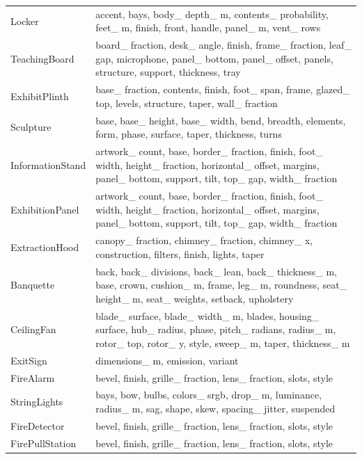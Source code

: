 \begin{longtable}{p{.20\linewidth}p{.74\linewidth}}
Locker & accent, bays, body\_ depth\_ m, contents\_ probability, feet\_ m, finish, front, handle, panel\_ m, vent\_ rows \\
TeachingBoard & board\_ fraction, desk\_ angle, finish, frame\_ fraction, leaf\_ gap, microphone, panel\_ bottom, panel\_ offset, panels, structure, support, thickness, tray \\
ExhibitPlinth & base\_ fraction, contents, finish, foot\_ span, frame, glazed\_ top, levels, structure, taper, wall\_ fraction \\
Sculpture & base, base\_ height, base\_ width, bend, breadth, elements, form, phase, surface, taper, thickness, turns \\
InformationStand & artwork\_ count, base, border\_ fraction, finish, foot\_ width, height\_ fraction, horizontal\_ offset, margins, panel\_ bottom, support, tilt, top\_ gap, width\_ fraction \\
ExhibitionPanel & artwork\_ count, base, border\_ fraction, finish, foot\_ width, height\_ fraction, horizontal\_ offset, margins, panel\_ bottom, support, tilt, top\_ gap, width\_ fraction \\
ExtractionHood & canopy\_ fraction, chimney\_ fraction, chimney\_ x, construction, filters, finish, lights, taper \\
Banquette & back, back\_ divisions, back\_ lean, back\_ thickness\_ m, base, crown, cushion\_ m, frame, leg\_ m, roundness, seat\_ height\_ m, seat\_ weights, setback, upholstery \\
CeilingFan & blade\_ surface, blade\_ width\_ m, blades, housing\_ surface, hub\_ radius, phase, pitch\_ radians, radius\_ m, rotor\_ top, rotor\_ y, style, sweep\_ m, taper, thickness\_ m \\
ExitSign & dimensions\_ m, emission, variant \\
FireAlarm & bevel, finish, grille\_ fraction, lens\_ fraction, slots, style \\
StringLights & bays, bow, bulbs, colors\_ srgb, drop\_ m, luminance, radius\_ m, sag, shape, skew, spacing\_ jitter, suspended \\
FireDetector & bevel, finish, grille\_ fraction, lens\_ fraction, slots, style \\
FirePullStation & bevel, finish, grille\_ fraction, lens\_ fraction, slots, style \\
\bottomrule
\end{longtable}
\normalsize
